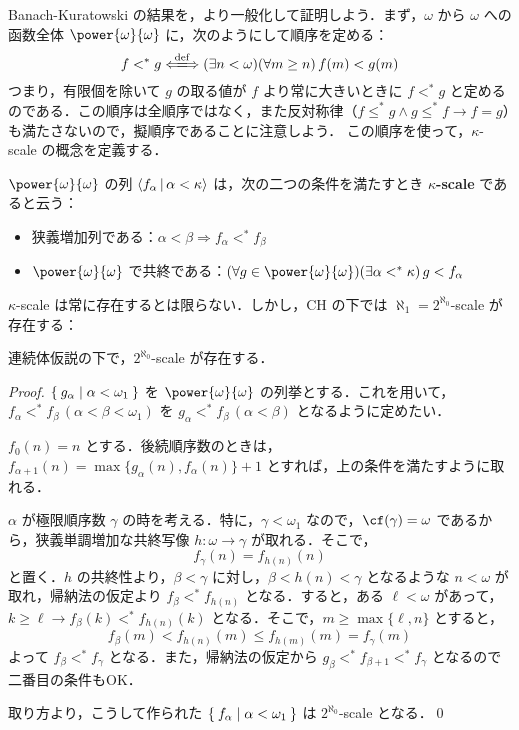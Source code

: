 \documentclass[a4j]{jsarticle}
\begin{document}
Banach-Kuratowski の結果を，より一般化して証明しよう．まず，$\omega$ から $\omega$ への函数全体 $\power{\omega}{\omega}$ に，次のようにして順序を定める：
\[
 f <^* g \defs (\exists n < \omega)(\forall m \geq n)\, f(m) < g(m)
\]
つまり，有限個を除いて $g$ の取る値が $f$ より常に大きいときに $f <^* g$ と定めるのである．この順序は全順序ではなく，また反対称律（$f \leq^* g \wedge g \leq^* f \longrightarrow f = g$）も満たさないので，擬順序であることに注意しよう．
この順序を使って，$\kappa$-scale の概念を定義する．
\begin{definition}[scale]
 $\power{\omega}{\omega}$ の列 $\Braket{f_\alpha | \alpha < \kappa}$ は，次の二つの条件を満たすとき {\bfseries $\kappa$-scale} であると云う：
 \begin{itemize}
  \item 狭義増加列である：$\alpha < \beta \Rightarrow f_\alpha <^* f_\beta$
  \item $\power{\omega}{\omega}$ で共終である：$(\forall g \in \power{\omega}{\omega})(\exists \alpha <^* \kappa)\, g < f_\alpha$
 \end{itemize}
\end{definition}
$\kappa$-scale は常に存在するとは限らない．しかし，CH の下では $\aleph_1 = 2^{\aleph_0}$-scale が存在する：
\begin{lemma}\label{lem:scale-exists-under-CH}
 連続体仮説の下で，$2^{\aleph_0}$-scale が存在する．
\end{lemma}
\begin{proof}
 $\Set{g_\alpha | \alpha < \omega_1}$ を $\power{\omega}{\omega}$ の列挙とする．これを用いて，$f_\alpha <^* f_\beta\, (\alpha < \beta < \omega_1)$ を $g_\alpha <^* f_\beta\,(\alpha < \beta)$ となるように定めたい．

 $f_0(n) = n$ とする．後続順序数のときは，$f_{\alpha + 1}(n) = \max\{g_\alpha(n), f_\alpha(n)\} + 1$ とすれば，上の条件を満たすように取れる．

 $\alpha$ が極限順序数 $\gamma$ の時を考える．特に，$\gamma < \omega_1$ なので，$\cf(\gamma) = \omega$ であるから，狭義単調増加な共終写像 $h: \omega \rightarrow \gamma$ が取れる．そこで，
 \[
  f_{\gamma}(n) = f_{h(n)}(n)
 \]
 と置く．$h$ の共終性より，$\beta < \gamma$ に対し，$\beta < h(n) < \gamma$ となるような $n < \omega$ が取れ，帰納法の仮定より $f_\beta <^* f_{h(n)}$ となる．すると，ある $\ell < \omega$ があって，$k \geq \ell \longrightarrow f_\beta(k) <^* f_{h(n)}(k)$ となる．そこで，$m \geq \max\{\ell, n\}$ とすると，
 \[
  f_\beta(m) < f_{h(n)}(m) \leq f_{h(m)}(m) = f_\gamma(m)
 \]
 よって $f_\beta <^* f_\gamma$ となる．また，帰納法の仮定から $g_\beta <^* f_{\beta + 1} <^* f_{\gamma}$ となるので二番目の条件もOK．

 取り方より，こうして作られた $\Set{f_\alpha | \alpha < \omega_1}$ は $2^{\aleph_0}$-scale となる．\qed
\end{proof}
\end{document}
